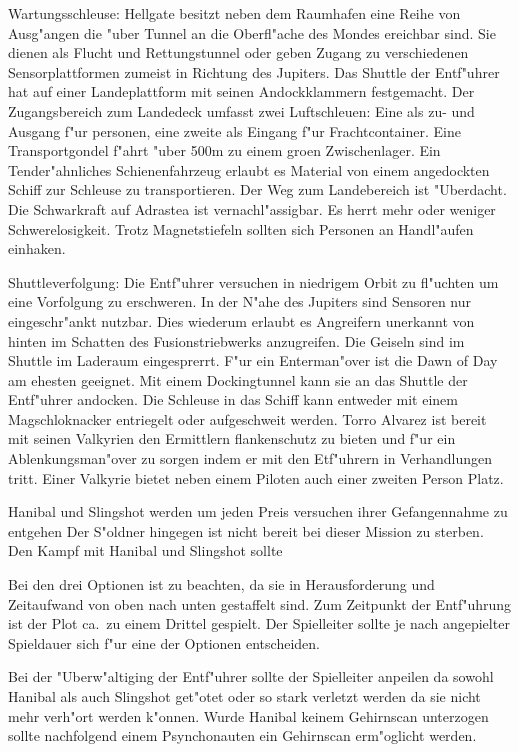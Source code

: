 Wartungsschleuse: Hellgate besitzt neben dem Raumhafen eine Reihe von Ausg"angen die "uber Tunnel an die Oberfl"ache des Mondes ereichbar sind. Sie dienen als Flucht und Rettungstunnel oder geben Zugang zu verschiedenen Sensorplattformen zumeist in Richtung des Jupiters. Das Shuttle der Entf"uhrer hat auf einer Landeplattform mit seinen Andockklammern festgemacht. Der Zugangsbereich zum Landedeck umfasst zwei Luftschleu\3en: Eine als zu- und Ausgang f"ur personen, eine zweite als Eingang f"ur Frachtcontainer. Eine Transportgondel f"ahrt "uber 500m zu einem gro\3en Zwischenlager. Ein Tender"ahnliches Schienenfahrzeug erlaubt es Material von einem angedockten Schiff zur Schleuse zu transportieren. Der Weg zum Landebereich ist "Uberdacht.  Die Schwarkraft auf Adrastea ist vernachl"assigbar. Es herrt mehr oder weniger Schwerelosigkeit. Trotz Magnetstiefeln sollten sich Personen an Handl"aufen einhaken.

Shuttleverfolgung: Die Entf"uhrer versuchen in niedrigem Orbit zu fl"uchten um eine Vorfolgung zu erschweren. In der N"ahe des Jupiters sind Sensoren nur eingeschr"ankt nutzbar. Dies wiederum erlaubt es Angreifern unerkannt von hinten im Schatten des Fusionstriebwerks anzugreifen. Die Geiseln sind im Shuttle im Laderaum eingesprerrt. F"ur ein Enterman"over ist die Dawn of Day am ehesten geeignet. Mit einem Dockingtunnel kann sie an das Shuttle der Entf"uhrer andocken. Die Schleuse in das Schiff kann entweder mit einem Magschlo\3knacker entriegelt oder aufgeschwei\3t werden. Torro Alvarez ist bereit mit seinen Valkyrien den Ermittlern flankenschutz zu bieten und f"ur ein Ablenkungsman"over zu sorgen indem er mit den Etf"uhrern in Verhandlungen tritt. Einer Valkyrie bietet neben einem Piloten auch einer zweiten Person Platz.

Hanibal und Slingshot werden um jeden Preis versuchen ihrer Gefangennahme zu entgehen Der S"oldner hingegen ist nicht bereit bei dieser Mission zu sterben. Den Kampf mit Hanibal und Slingshot sollte

\begin{remarks}
	Bei den drei Optionen ist zu beachten, da\3 sie in Herausforderung und Zeitaufwand von oben nach unten gestaffelt sind. Zum Zeitpunkt der Entf"uhrung ist der Plot ca.~zu einem Drittel gespielt. Der Spielleiter sollte je nach angepielter Spieldauer sich f"ur eine der Optionen entscheiden.

	Bei der "Uberw"altiging der Entf"uhrer sollte der Spielleiter anpeilen da\3 sowohl Hanibal als auch Slingshot get"otet oder so stark verletzt werden da\3 sie nicht mehr verh"ort werden k"onnen. Wurde Hanibal keinem Gehirnscan unterzogen sollte nachfolgend einem Psynchonauten ein Gehirnscan erm"oglicht werden.
\end{remarks}


